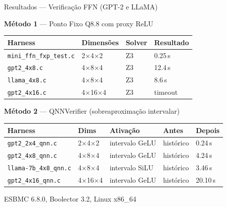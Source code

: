 \documentclass[aspectratio=169]{beamer}
\begin{document}
\begin{frame}{Resultados --- Verificação FFN (GPT-2 e LLaMA)}
  \begin{center}
    \textbf{Método 1} --- Ponto Fixo Q8.8 com proxy ReLU
    \vspace{0.2em}

    \small
    \begin{tabular}{llll}
      \toprule
      \textbf{Harness} & \textbf{Dimensões} & \textbf{Solver} & \textbf{Resultado} \\
      \midrule
      \texttt{mini\_ffn\_fxp\_test.c} & 2$\times$4$\times$2 & Z3 & \textcolor{okgreen}{0.25\,s} \\
      \texttt{gpt2\_4x8.c}            & 4$\times$8$\times$4 & Z3 & \textcolor{okgreen}{12.4\,s} \\
      \texttt{llama\_4x8.c}           & 4$\times$8$\times$4 & Z3 & \textcolor{okgreen}{8.6\,s} \\
      \texttt{gpt2\_4x16.c}           & 4$\times$16$\times$4 & Z3 & \textcolor{failred}{timeout} \\
      \bottomrule
    \end{tabular}
  \end{center}

  \vspace{0.6em}
  \begin{center}
    \textbf{Método 2} --- QNNVerifier (sobreaproximação intervalar)
    \vspace{0.2em}

    \small
    \begin{tabular}{lllll}
      \toprule
      \textbf{Harness} & \textbf{Dims} & \textbf{Ativação} & \textbf{Antes} & \textbf{Depois} \\
      \midrule
      \texttt{gpt2\_2x4\_qnn.c}     & 2$\times$4$\times$2  & intervalo GeLU & histórico & \textcolor{okgreen}{0.24\,s} \\
      \texttt{gpt2\_4x8\_qnn.c}     & 4$\times$8$\times$4  & intervalo GeLU & histórico & \textcolor{okgreen}{4.24\,s} \\
      \texttt{llama-7b\_4x8\_qnn.c} & 4$\times$8$\times$4  & intervalo SiLU & histórico & \textcolor{okgreen}{3.46\,s} \\
      \texttt{gpt2\_4x16\_qnn.c}    & 4$\times$16$\times$4 & intervalo GeLU & histórico & \textcolor{okgreen}{20.10\,s} \\
      \bottomrule
    \end{tabular}
  \end{center}
  \vspace{0.2em}
  \begin{center}
    \scriptsize ESBMC 6.8.0, Boolector 3.2, Linux x86\_64
  \end{center}
\end{frame}
\end{document}
